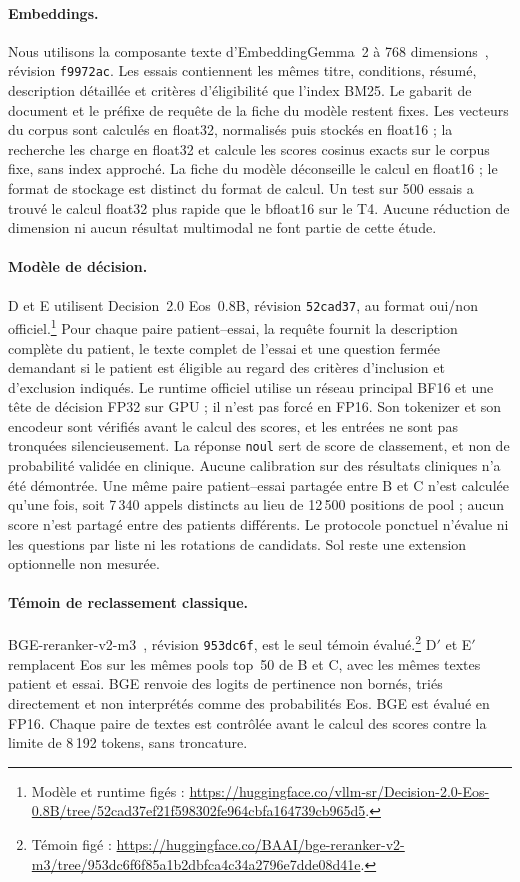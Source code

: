 \documentclass{article}
\begin{document}
\paragraph{Embeddings.} Nous utilisons la composante texte d'EmbeddingGemma~2 à 768 dimensions~\citep{embeddinggemma2}, révision \texttt{f9972ac}. Les essais contiennent les mêmes titre, conditions, résumé, description détaillée et critères d'éligibilité que l'index BM25. Le gabarit de document et le préfixe de requête de la fiche du modèle restent fixes. Les vecteurs du corpus sont calculés en float32, normalisés puis stockés en float16 ; la recherche les charge en float32 et calcule les scores cosinus exacts sur le corpus fixe, sans index approché. La fiche du modèle déconseille le calcul en float16 ; le format de stockage est distinct du format de calcul. Un test sur 500 essais a trouvé le calcul float32 plus rapide que le bfloat16 sur le T4. Aucune réduction de dimension ni aucun résultat multimodal ne font partie de cette étude.

\paragraph{Modèle de décision.} D et E utilisent Decision~2.0 Eos~0.8B, révision \texttt{52cad37}, au format oui/non officiel.\footnote{Modèle et runtime figés : \url{https://huggingface.co/vllm-sr/Decision-2.0-Eos-0.8B/tree/52cad37ef21f598302fe964cbfa164739cb965d5}.} Pour chaque paire patient--essai, la requête fournit la description complète du patient, le texte complet de l'essai et une question fermée demandant si le patient est éligible au regard des critères d'inclusion et d'exclusion indiqués. Le runtime officiel utilise un réseau principal BF16 et une tête de décision FP32 sur GPU ; il n'est pas forcé en FP16. Son tokenizer et son encodeur sont vérifiés avant le calcul des scores, et les entrées ne sont pas tronquées silencieusement. La réponse \texttt{noul} sert de score de classement, et non de probabilité validée en clinique. Aucune calibration sur des résultats cliniques n'a été démontrée. Une même paire patient--essai partagée entre B et C n'est calculée qu'une fois, soit 7\,340 appels distincts au lieu de 12\,500 positions de pool ; aucun score n'est partagé entre des patients différents. Le protocole ponctuel n'évalue ni les questions par liste ni les rotations de candidats. Sol reste une extension optionnelle non mesurée.

\paragraph{Témoin de reclassement classique.} BGE-reranker-v2-m3~\citep{chen2024bgem3}, révision \texttt{953dc6f}, est le seul témoin évalué.\footnote{Témoin figé : \url{https://huggingface.co/BAAI/bge-reranker-v2-m3/tree/953dc6f6f85a1b2dbfca4c34a2796e7dde08d41e}.} D$'$ et E$'$ remplacent Eos sur les mêmes pools top~50 de B et C, avec les mêmes textes patient et essai. BGE renvoie des logits de pertinence non bornés, triés directement et non interprétés comme des probabilités Eos. BGE est évalué en FP16. Chaque paire de textes est contrôlée avant le calcul des scores contre la limite de 8\,192 tokens, sans troncature.
\end{document}
